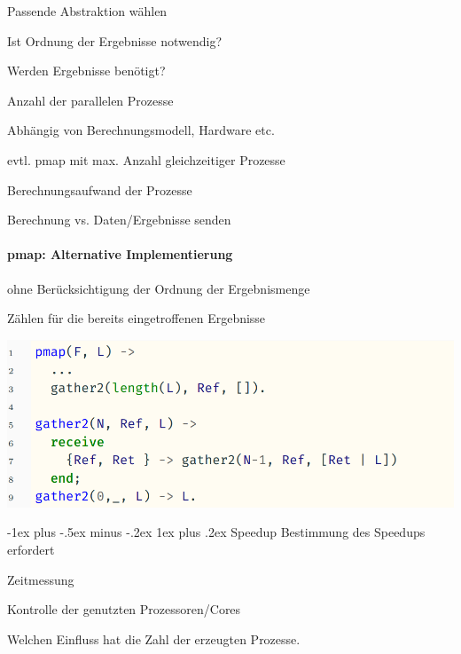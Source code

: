 \documentclass[10pt]{article}
\makeatletter
\renewcommand{\subsubsection}{\@startsection{subsubsection}{3}{0mm}%
                                {-1ex plus -.5ex minus -.2ex}%
                                {1ex plus .2ex}%
                                {\normalfont\small\bfseries}}
\makeatother
\begin{document}
\begin{itemize*}
  \item Passende Abstraktion wählen
  \begin{itemize*}
    \item Ist Ordnung der Ergebnisse notwendig?
    \item Werden Ergebnisse benötigt?
  \end{itemize*}
  \item Anzahl der parallelen Prozesse
  \begin{itemize*}
    \item Abhängig von Berechnungsmodell, Hardware etc.
    \item evtl. pmap mit max. Anzahl gleichzeitiger Prozesse
  \end{itemize*}
  \item Berechnungsaufwand der Prozesse
  \begin{itemize*}
    \item Berechnung vs. Daten/Ergebnisse senden
  \end{itemize*}
\end{itemize*}

\paragraph{pmap: Alternative Implementierung}

\begin{itemize*}
  \item ohne Berücksichtigung der Ordnung der Ergebnismenge
  \item Zählen für die bereits eingetroffenen Ergebnisse
\end{itemize*}
\begin{center}
  \includegraphics[width=0.4\linewidth]{Assets/Programmierparadigmen-code-snippet-08}
\end{center}

\subsubsection{Speedup}
Bestimmung des Speedups erfordert
\begin{itemize*}
  \item Zeitmessung
  \item Kontrolle der genutzten Prozessoren/Cores
\end{itemize*}
\color{orange} Welchen Einfluss hat die Zahl der erzeugten Prozesse. \color{black}
\end{document}
